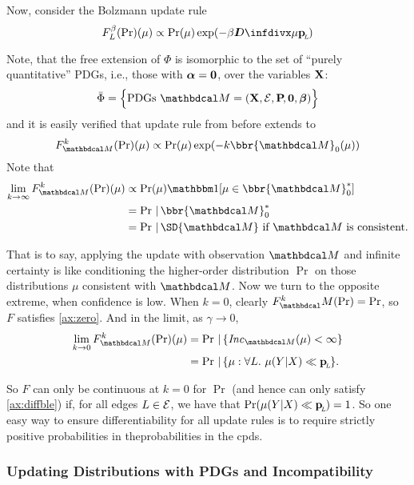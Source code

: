 \documentclass{article}
\begin{document}
Now, consider the Bolzmann update rule
\[
	F_L^{\beta}(\Pr) (\mu) \propto \Pr(\mu) \exp(-\beta \kldiv\mu \bp)
\]

Note, that the free extension of $\Phi$ is isomorphic to the set of ``purely quantitative'' PDGs, i.e., those with $\boldsymbol\alpha = \mathbf{0}$, over the variables $\mathbf{X}$:
$$
	\bar\Phi = \Big\{ \text{PDGs}~\dg M = (\mat X, \Ed, \bP[], \mat0, \bbeta) \Big\}
$$
and it is easily verified that update rule from before extends to
\[
	F_{\dg M}^k(\Pr)(\mu) \propto \Pr(\mu) \exp(- k \bbr{\dg M}_0(\mu))
\]
Note that
\begin{align*}
	\lim_{k \to \infty} F_{\dg M}^k(\Pr)(\mu) &\propto
		\Pr(\mu) \mathbbm1[\mu \in {\bbr{\dg M}^*_0}] \\
		&= \Pr \,|\, \bbr{\dg M}^*_0 \\
		&= \Pr \,|\, \SD{\dg M} \text{~if $\dg M$ is consistent.}
\end{align*}

That is to say, applying the update with observation $\dg M$ and infinite certainty is like conditioning the higher-order distribution $\Pr$ on those distributions $\mu$ consistent with $\dg M$.
Now we turn to the opposite extreme, when confidence is low. When $k=0$, clearly $F^k_\dg M(\Pr) = \Pr$, so $F$ satisfies \cref{ax:zero}. And in the limit, as $\gamma \to 0$,
\begin{align*}
	\lim_{k \to 0} F_{\dg M}^k(\Pr)(\mu) &= \Pr \,|\, \{ \Inc_{\dg M}(\mu) < \infty \} \\
		&= \Pr \,|\, \{\mu : \forall L.~\mu(Y|X) \ll \bp \}.
\end{align*}

So $F$ can only be continuous at $k=0$ for $\Pr$ (and hence can only satisfy \cref{ax:diffble}) if, for all edges $L \in \mathcal E$, we have that $\Pr(\mu(Y|X) \ll \mathbf{p}_{\!_{L}\!}) = 1$.
So one easy way to ensure differentiability for all update rules is to require strictly positive probabilities in theprobabilities in the cpds.



\subsubsection{Updating Distributions with PDGs and Incompatibility}
\def\tauur{\mathtt{CPD\_UR}}
\end{document}
